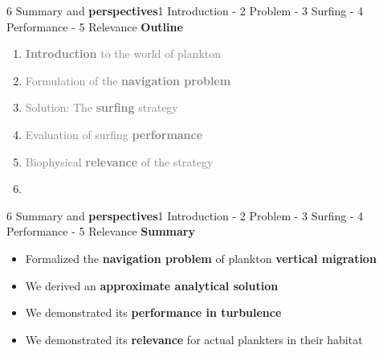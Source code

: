 
\begin{frame}{6 Summary and \textbf{perspectives}}{1 Introduction - 2 Problem - 3 Surfing - 4 Performance - 5 Relevance}
	\centering
	\vspace{15pt}
	\textbf{\Large Outline}

	\vspace{15pt}

	\large
	\begin{enumerate}
		\setlength\itemsep{10pt}
		\item \textcolor{gray}{\textbf{Introduction} to the world of plankton}
		\item \textcolor{gray}{Formulation of the \textbf{navigation problem}}
		\item \textcolor{gray}{Solution: The \textbf{surfing} strategy}
		\item \textcolor{gray}{Evaluation of surfing \textbf{performance}}
		\item \textcolor{gray}{Biophysical \textbf{relevance} of the strategy}
		\item \textcolor{white}{Summary and \textbf{perspectives}}
	\end{enumerate}
\end{frame}

\begin{frame}{6 Summary and \textbf{perspectives}}{1 Introduction - 2 Problem - 3 Surfing - 4 Performance - 5 Relevance}
	\centering
	\vspace{5pt}
	\textbf{\Large Summary}

	\vspace{10pt}
	\centering
	\begin{itemize}
		\setlength\itemsep{2pt}
		\item<1-> Formalized the \textbf{navigation problem} of plankton \textbf{vertical migration}
		\item<2-> We derived an \textbf{approximate analytical solution}
		\item<3-> We demonstrated its \textbf{performance in turbulence}
		\item<4-> We demonstrated its \textbf{relevance} for actual plankters in their habitat
	\end{itemize}

	\vspace{40pt}
\end{frame}

